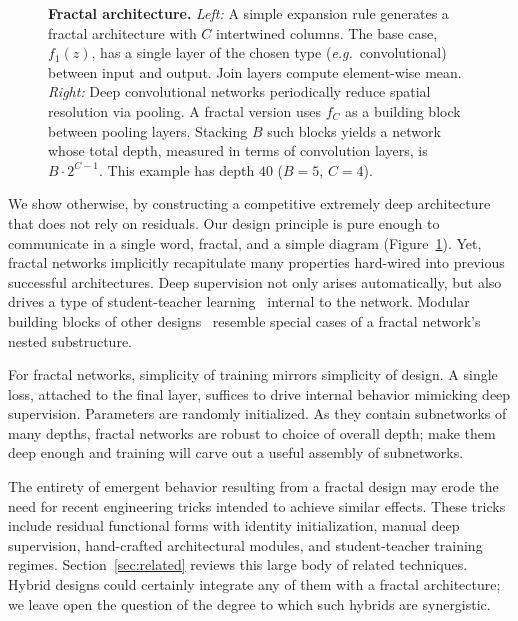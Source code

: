 \documentclass{article}
\def\eg{\emph{e.g.}}
\begin{document}
\begin{figure}[ht]
   \begin{center}
      
   \end{center}
   \vspace{-0.02\linewidth}
   \caption{
      \textbf{Fractal architecture.}
      \emph{Left:}
         A simple expansion rule generates a fractal architecture with $C$
         intertwined columns.  The base case, $f_1(z)$, has a single layer
         of the chosen type (\eg~convolutional) between input and output.
         Join layers compute element-wise mean.
      \emph{Right:}
         Deep convolutional networks periodically reduce spatial resolution
         via pooling.  A fractal version uses $f_C$ as a building block
         between pooling layers.  Stacking $B$ such blocks yields a network
         whose total depth, measured in terms of convolution layers, is
         $B \cdot 2^{C-1}$.  This example has depth $40$ ($B=5$, $C=4$).
   }
   \label{fig:fractalnet}
\end{figure}

We show otherwise, by constructing a competitive extremely deep architecture
that does not rely on residuals.  Our design principle is pure enough to
communicate in a single word, fractal, and a simple diagram
(Figure~\ref{fig:fractalnet}).  Yet, fractal networks implicitly recapitulate
many properties hard-wired into previous successful architectures.  Deep
supervision not only arises automatically, but also drives a type of
student-teacher learning~\citep{ba2014dodeep,urban2016dodeepsfollowup} internal
to the network.  Modular building blocks of other designs~\citep{
szegedy2015inception,liao2015competitive} resemble special cases of a fractal
network's nested substructure.

For fractal networks, simplicity of training mirrors simplicity of design.
A single loss, attached to the final layer, suffices to drive internal
behavior mimicking deep supervision.  Parameters are randomly initialized.
As they contain subnetworks of many depths, fractal networks are robust to
choice of overall depth; make them deep enough and training will carve out a
useful assembly of subnetworks.

The entirety of emergent behavior resulting from a fractal design may erode
the need for recent engineering tricks intended to achieve similar effects.
These tricks include residual functional forms with identity initialization,
manual deep supervision, hand-crafted architectural modules, and
student-teacher training regimes.  Section~\ref{sec:related} reviews this
large body of related techniques.  Hybrid designs could certainly integrate
any of them with a fractal architecture; we leave open the question of the
degree to which such hybrids are synergistic.
\end{document}
